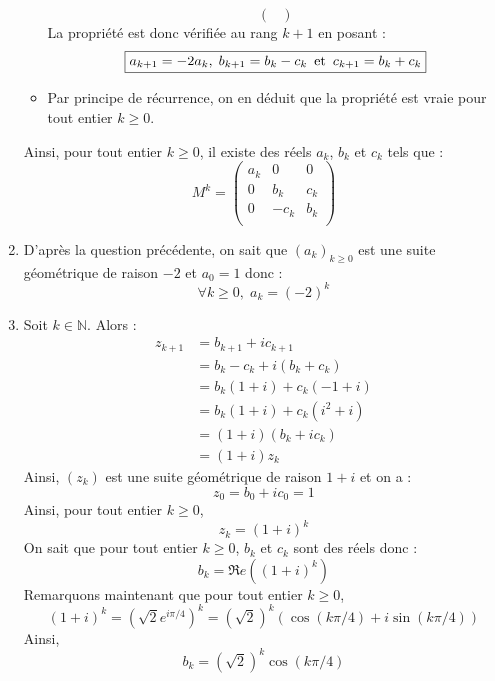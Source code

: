 \documentclass[a4paper,twoside,french,10pt]{VcCours}
\begin{document}
\begin{enumerate}
\begin{itemize}
$$\begin{pmatrix}
    \end{pmatrix}$$
    La propriété est donc vérifiée au rang $k+1$ en posant :
    $$ \boxed{a_{k+1}= -2 a_k, \; b_{k+1} = b_k - c_k \, \hbox{ et } \, c_{k+1}= b_k+c_k}$$
    \item Par principe de récurrence, on en déduit que la propriété est vraie pour tout entier $k \geq 0$.
    \end{itemize}
    Ainsi, pour tout entier $k \geq 0$, il existe des réels $a_k$, $b_k$ et $c_k$ tels que :
    $$ \boxed{M^k = \begin{pmatrix}
    a_k & 0 & 0 \\
    0 & b_k & c_k \\
    0 & -c_k & b_k \\
    \end{pmatrix}}$$
    \item D'après la question précédente, on sait que $(a_k)_{k \geq 0}$ est une suite géométrique de raison $-2$ et $a_0=1$ donc :
    $$ \boxed{\forall k \geq 0, \; a_k = (-2)^k}$$
    \item Soit $k \in \mathbb{N}$. Alors :
    \begin{align*}
    z_{k+1} & = b_{k+1} + i c_{k+1} \\
    & = b_k - c_k + i (b_k+c_k) \\
    & = b_k (1+i) + c_k (-1+i) \\
    & = b_k (1+i) + c_k (i^2+i) \\
    & = (1+i)(b_k+i c_k) \\
    & = (1+i) z_k
    \end{align*}
    Ainsi, $(z_k)$ est une suite géométrique de raison $1+i$ et on a :
    $$ z_0 = b_0+i c_0 = 1$$
    Ainsi, pour tout entier $k \geq 0$,
    $$ \boxed{z_k = (1+i)^k}$$
    On sait que pour tout entier $k \geq 0$, $b_k$ et $c_k$ sont des réels donc :
    $$ \boxed{b_k = \Re e((1+i)^k)}$$
    Remarquons maintenant que pour tout entier $k \geq 0$,
    $$ (1+i)^k = \left( \sqrt{2} e^{i \pi/4} \right)^k = \left(\sqrt{2}\right)^k (\cos(k \pi/4)+i \sin(k \pi/4))$$
    Ainsi,
    $$ \boxed{b_k = \left(\sqrt{2}\right)^k \cos(k \pi/4)}$$

\end{enumerate}
\end{document}
